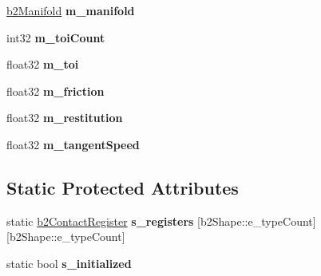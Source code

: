 \begin{DoxyCompactItemize}
\item 
\hyperlink{structb2_manifold}{b2\+Manifold} {\bfseries m\+\_\+manifold}\hypertarget{classb2_contact_aebdc2c073d05ac8e544a591d2043b251}{}\label{classb2_contact_aebdc2c073d05ac8e544a591d2043b251}

\item 
int32 {\bfseries m\+\_\+toi\+Count}\hypertarget{classb2_contact_afaa231f3e9a908154f9a32af456601b6}{}\label{classb2_contact_afaa231f3e9a908154f9a32af456601b6}

\item 
float32 {\bfseries m\+\_\+toi}\hypertarget{classb2_contact_aa9e75253eaac6efdb6485a8646ac553f}{}\label{classb2_contact_aa9e75253eaac6efdb6485a8646ac553f}

\item 
float32 {\bfseries m\+\_\+friction}\hypertarget{classb2_contact_ac7915ef6f92d609ee0a43d518b4f9e75}{}\label{classb2_contact_ac7915ef6f92d609ee0a43d518b4f9e75}

\item 
float32 {\bfseries m\+\_\+restitution}\hypertarget{classb2_contact_a6bc56522b4c04e28bee3542a7fc2f796}{}\label{classb2_contact_a6bc56522b4c04e28bee3542a7fc2f796}

\item 
float32 {\bfseries m\+\_\+tangent\+Speed}\hypertarget{classb2_contact_a70bbcb5cf7ade19ad986a6a1168e2b89}{}\label{classb2_contact_a70bbcb5cf7ade19ad986a6a1168e2b89}

\end{DoxyCompactItemize}
\subsection*{Static Protected Attributes}
\begin{DoxyCompactItemize}
\item 
static \hyperlink{structb2_contact_register}{b2\+Contact\+Register} {\bfseries s\+\_\+registers} \mbox{[}b2\+Shape\+::e\+\_\+type\+Count\mbox{]}\mbox{[}b2\+Shape\+::e\+\_\+type\+Count\mbox{]}\hypertarget{classb2_contact_a11e5b67d3e46ff9306d642a776e18890}{}\label{classb2_contact_a11e5b67d3e46ff9306d642a776e18890}

\item 
static bool {\bfseries s\+\_\+initialized}\hypertarget{classb2_contact_a672598c350694d7b9a89c45f8ad0dd90}{}\label{classb2_contact_a672598c350694d7b9a89c45f8ad0dd90}

\end{DoxyCompactItemize}
